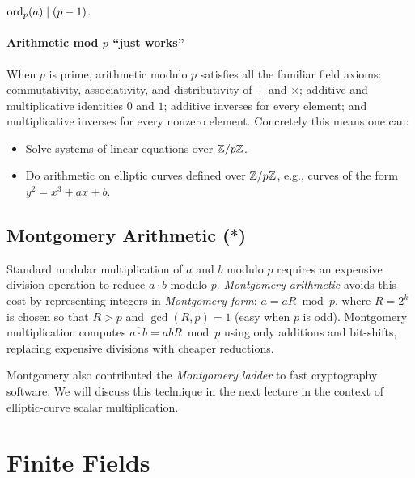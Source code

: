 \documentclass[11pt]{article}
\begin{document}
\begin{fact}
  $\operatorname{ord}_p(a) \mid (p-1)$.
\end{fact}

\paragraph{Arithmetic mod $p$ ``just works''}
When $p$ is prime, arithmetic modulo $p$ satisfies all the familiar
field axioms: commutativity, associativity, and distributivity of $+$
and $\times$; additive and multiplicative identities $0$ and $1$;
additive inverses for every element; and multiplicative inverses for
every nonzero element.  Concretely this means one can:
\begin{itemize}
  \item Solve systems of linear equations over $\mathbb{Z}/p\mathbb{Z}$.
  \item Do arithmetic on elliptic curves defined over $\mathbb{Z}/p\mathbb{Z}$,
    e.g., curves of the form $y^2 = x^3 + ax + b$.
\end{itemize}

\subsection{Montgomery Arithmetic ($*$)}

Standard modular multiplication of $a$ and $b$ modulo $p$ requires an
expensive division operation to reduce $a \cdot b$ modulo $p$.
\emph{Montgomery arithmetic} avoids this cost by representing integers
in \emph{Montgomery form}: $\bar{a} = aR \bmod p$, where
$R = 2^k$ is chosen so that $R > p$ and $\gcd(R, p) = 1$ (easy when
$p$ is odd).  Montgomery multiplication computes
$\overline{a \cdot b} = ab R \bmod p$ using only additions and
bit-shifts, replacing expensive divisions with cheaper reductions.

\begin{remark}
  Montgomery also contributed the \emph{Montgomery ladder} to fast
  cryptography software.  We will discuss this technique in the next
  lecture in the context of elliptic-curve scalar multiplication.
\end{remark}

\section{Finite Fields}
\end{document}
